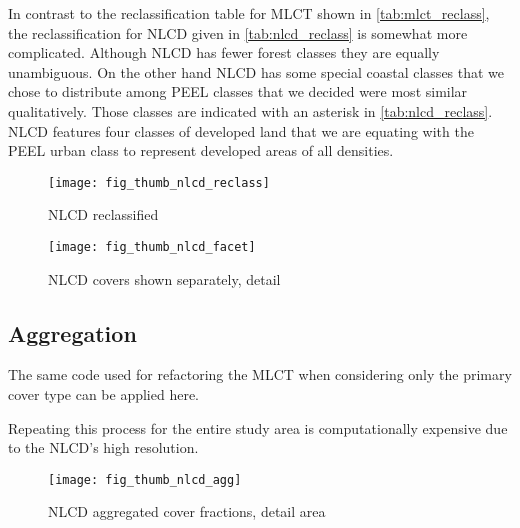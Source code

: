 In contrast to the reclassification table for MLCT shown in
\autoref{tab:mlct_reclass}, the reclassification for NLCD given in
\autoref{tab:nlcd_reclass} is somewhat more complicated.  Although
NLCD has fewer forest classes they are equally unambiguous.  On the
other hand NLCD has some special coastal classes that we chose to
distribute among PEEL classes that we decided were most similar
qualitatively.  Those classes are indicated with an asterisk in
\autoref{tab:nlcd_reclass}.  NLCD features four classes of developed
land that we are equating with the PEEL urban class to represent
developed areas of all densities.



\begin{figure}[htp] 
\centering


\texttt{[image: fig\_thumb\_nlcd\_reclass]}
 
\caption{NLCD reclassified} 
\label{fig:thumb_nlcd_reclass} 
\end{figure} 

\begin{figure}[htp] 
\centering
  

\texttt{[image: fig\_thumb\_nlcd\_facet]}
 
\caption{NLCD covers shown separately, detail} 
\label{fig:thumb_nlcd_facet} 
\end{figure} 

\clearpage

\subsection{Aggregation}
\label{sec:nlcd-aggr}

The same code used for refactoring the MLCT when considering only the
primary cover type can be applied here.

Repeating this process for the entire study area is computationally
expensive due to the NLCD's high resolution.


 

\begin{figure}[htp] 
\centering
  


\texttt{[image: fig\_thumb\_nlcd\_agg]}
 
\caption{NLCD aggregated cover fractions, detail area}
\label{fig:thumb_nlcd_agg}
\end{figure} 



